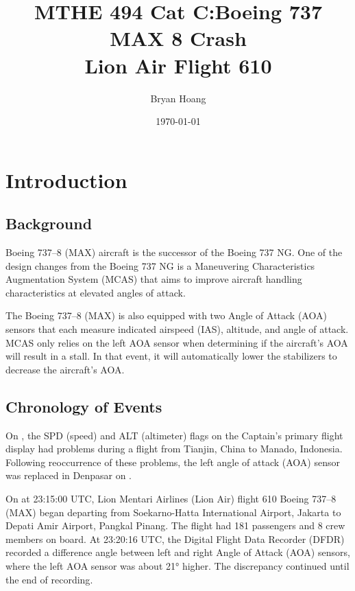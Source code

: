 \documentclass[
  10pt,
  promotesection,
  endnotes,
  draft,
]{memreport}
\title{
  MTHE 494 Cat C:\@ Boeing 737 MAX 8 Crash\\
  Lion Air Flight 610
}
\author{Bryan Hoang}
\date{\today}
\begin{document}
  \begin{titlingpage}
    \maketitle
  \end{titlingpage}

  \mainmatter{}


  \section{Introduction}
  \subsection{Background}
  Boeing 737--8 (MAX) aircraft is the successor of the Boeing 737 NG. One of the design changes from the Boeing 737 NG is a Maneuvering Characteristics Augmentation System (MCAS) that aims to improve aircraft handling characteristics at elevated angles of attack\autocite[I]{noauthor_boeing_2019}.

  The Boeing 737--8 (MAX) is also equipped with two Angle of Attack (AOA) sensors that each measure indicated airspeed (IAS), altitude, and angle of attack\autocite[xviii]{noauthor_aircraft_2019}. MCAS only relies on the left AOA sensor when determining if the aircraft's AOA will result in a stall\autocite[\nopp{}195]{noauthor_aircraft_2019}. In that event, it will automatically lower the stabilizers to decrease the aircraft's AOA.\@

  \subsection{Chronology of Events}
  On , the SPD (speed) and ALT (altimeter) flags on the Captain's primary flight display had problems during a flight from Tianjin, China to Manado, Indonesia. Following reoccurrence of these problems, the left angle of attack (AOA) sensor was replaced in Denpasar on \autocite[\nopp{}xviii]{noauthor_aircraft_2019}.

  On  at 23:15:00 UTC, Lion Mentari Airlines (Lion Air) flight 610 Boeing 737--8 (MAX) began departing from Soekarno-Hatta International Airport, Jakarta to Depati Amir Airport, Pangkal Pinang. The flight had 181 passengers and 8 crew members on board\autocite[\nopp{}19]{noauthor_aircraft_2019}. At 23:20:16 UTC, the Digital Flight Data Recorder (DFDR) recorded a difference angle between left and right Angle of Attack (AOA) sensors, where the left AOA sensor was about 21° higher. The discrepancy continued until the end of recording\autocite[\nopp{}19]{noauthor_aircraft_2019}.
\end{document}
